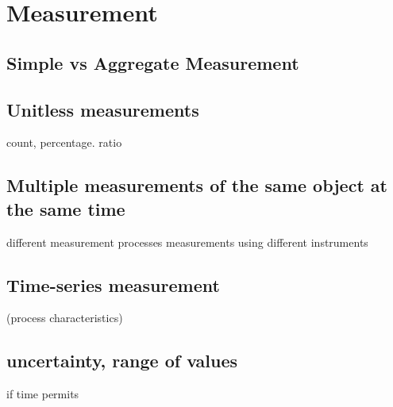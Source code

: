 \chapter{Measurement}

\section{Simple vs Aggregate Measurement}

\section{Unitless measurements}
count, percentage. ratio

\section{Multiple measurements of the same object at the same time}
different measurement processes 
measurements using different instruments

\section{Time-series measurement}
(process characteristics)

\section{uncertainty, range of values}
if time permits

